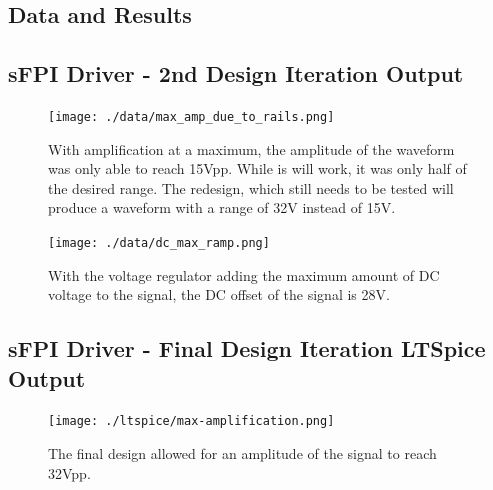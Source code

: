 \documentclass[12pt,journal]{IEEEtran}
\begin{document}
\begin{appendices}
\onecolumn



\section{Data and Results} 

\subsection{sFPI Driver - 2nd Design Iteration Output} \label{ss:output-signal-graphs}

\begin{figure}[h!]
	\centering
	\texttt{[image: ./data/max\_amp\_due\_to\_rails.png]}
	\caption{With amplification at a maximum, the amplitude of the waveform was only able to reach 15Vpp. While is will work, it was only half of the desired range. The redesign, which still needs to be tested will produce a waveform with a range of 32V instead of 15V.}
	\label{fig:max-amp-2nd-iteration}
\end{figure}
\newpage

\begin{figure}[h!]
	\centering
	\texttt{[image: ./data/dc\_max\_ramp.png]}
	\caption{With the voltage regulator adding the maximum amount of DC voltage to the signal, the DC offset of the signal is 28V.}
	\label{fig:max-dc-offset}
\end{figure}
\newpage

\subsection{sFPI Driver - Final Design Iteration LTSpice Output} \label{subss:final-design-output}

\begin{figure}[h!]
	\centering
	\texttt{[image: ./ltspice/max-amplification.png]}
	\caption{The final design allowed for an amplitude of the signal to reach 32Vpp.}
	\label{fig:max-amp-final-iteration}
\end{figure}
\newpage


\end{appendices}
\end{document}
